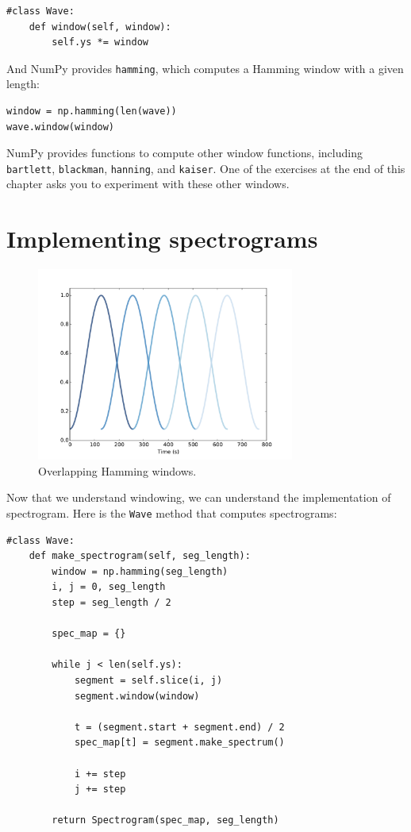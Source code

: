 \documentclass[12pt]{book}
\begin{document}
\begin{verbatim}
#class Wave:
    def window(self, window):
        self.ys *= window
\end{verbatim}

And NumPy provides {\tt hamming}, which computes a Hamming window
with a given length:

\begin{verbatim}
window = np.hamming(len(wave))
wave.window(window)
\end{verbatim}

NumPy provides functions to compute other window
functions, including {\tt bartlett}, {\tt blackman}, {\tt hanning},
and {\tt kaiser}.  One of the exercises at the end of this chapter
asks you to experiment with these other windows.


\section{Implementing spectrograms}

\begin{figure}
\centerline{\includegraphics[height=2.5in]{figs/windowing3.pdf}}
\caption{Overlapping Hamming windows.}
\label{fig.windowing3}
\end{figure}

Now that we understand windowing, we can understand the
implementation of spectrogram.
Here is the {\tt Wave} method that computes spectrograms:

\begin{verbatim}
#class Wave:
    def make_spectrogram(self, seg_length):
        window = np.hamming(seg_length)
        i, j = 0, seg_length
        step = seg_length / 2

        spec_map = {}

        while j < len(self.ys):
            segment = self.slice(i, j)
            segment.window(window)

            t = (segment.start + segment.end) / 2
            spec_map[t] = segment.make_spectrum()

            i += step
            j += step

        return Spectrogram(spec_map, seg_length)
\end{verbatim}
\end{document}
